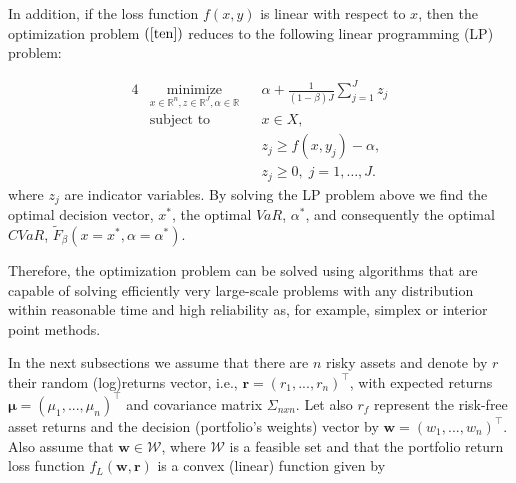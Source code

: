 \documentclass[a4paper,12pt]{report}
\begin{document}
In addition, if the loss function $f(x,y)$ is linear with respect to
\thinspace $x$, then the optimization problem $\left( \ref{ten}\right) $
reduces to the following linear programming (LP) problem:%

\begin{alignat}{4}
& \underset{x \in \mathbb{R}^{n},z\in 	\mathbb{R}^{J},\alpha \in \mathbb{R}}{\text{minimize}}
& & \alpha +\frac{1}{\left( 1-\beta \right)  J}\sum_{j=1}^{J}z_{j}
\\ 
& \text{subject to} 
& & x\in X,\\
&&& z_{j}\geq f(x,y_{j})-\alpha , \\
&&& z_{j}\geq 0, \; j = 1, \ldots, J.
\end{alignat}
where $z_{j}$ are indicator variables. By solving the LP problem above we
find the optimal decision vector, $x^{\ast }$, the optimal $VaR$, $\alpha
^{\ast }$, and consequently the optimal $CVaR$, $\widetilde{F}_{\beta
}\left( x=x^{\ast },\alpha=\alpha ^{\ast }\right) $.

Therefore, the optimization problem can be solved using algorithms that are
capable of solving efficiently very large-scale problems with any
distribution within reasonable time and high reliability as, for example,
simplex or interior point methods.

In the next subsections we assume that there are $n$ risky assets and denote
by $r$ their random (log)returns vector, i.e., $\mathbf{r}\mathbf{=}\left(
r_{1},...,r_{n}\right) ^{\top }$, with expected returns $\mathbf{\mu }%
\mathbf{=}\left( \mu _{1},...,\mu _{n}\right) ^{\top }$ and covariance
matrix $\Sigma _{nxn}$. Let also $r_{f}$ represent the risk-free asset
returns and the decision (portfolio's weights) vector by $\mathbf{w}\mathbf{=%
}\left( w_{1},...,w_{n}\right) ^{\top }$. Also assume that $\mathbf{w}\in
\mathcal{W}$, where $\mathcal{W}$ is a feasible set and that the portfolio
return loss function $f_{L}\left( \mathbf{w,r}\right) $ is a convex (linear)
function given by
\end{document}
